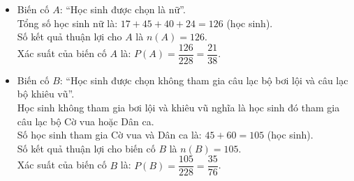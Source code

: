 \begin{bt}
{\begin{enumerate}[a)]
\begin{itemize}
        \item Biến cố $A$: “Học sinh được chọn là nữ”.\\
        Tổng số học sinh nữ là: $17 + 45 + 40 + 24 = 126$ (học sinh).\\
        Số kết quả thuận lợi cho $A$ là $n(A) = 126$.\\
        Xác suất của biến cố $A$ là:
        $P(A) = \dfrac{126}{228} = \dfrac{21}{38}$.
        \item Biến cố $B$: “Học sinh được chọn không tham gia câu lạc bộ bơi lội và câu lạc bộ khiêu vũ”.\\
        Học sinh không tham gia bơi lội và khiêu vũ nghĩa là học sinh đó tham gia câu lạc bộ Cờ vua hoặc Dân ca.\\
        Số học sinh tham gia Cờ vua và Dân ca là:
        $45 + 60 = 105$ (học sinh).\\
        Số kết quả thuận lợi cho biến cố $B$ là $n(B) = 105$.\\
        Xác suất của biến cố $B$ là:
        $P(B) = \dfrac{105}{228} = \dfrac{35}{76}$.
    \end{itemize}
\end{enumerate}
}
\end{bt}

